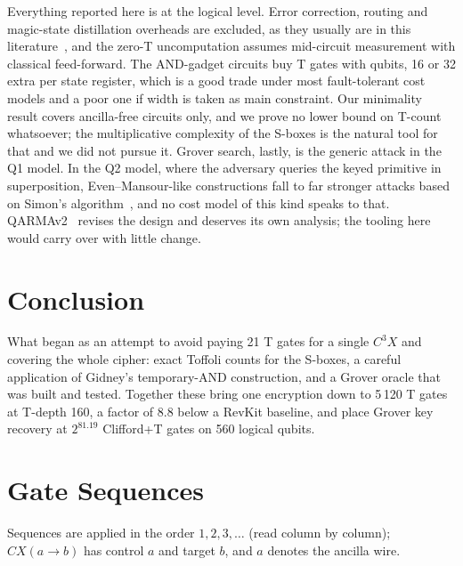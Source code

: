 \documentclass[runningheads,10pt]{llncs}
\begin{document}
Everything reported here is at the logical level. Error correction, routing and magic-state distillation overheads are excluded, as they usually are in this literature~\cite{grassl2016applying,jaques2020implementing}, and the zero-T uncomputation assumes mid-circuit measurement with classical feed-forward. The AND-gadget circuits buy T gates with qubits, 16 or 32 extra per state register, which is a good trade under most fault-tolerant cost models and a poor one if width is taken as main  constraint. Our minimality result covers ancilla-free circuits only, and we prove no lower bound on T-count whatsoever; the multiplicative complexity of the S-boxes is the natural tool for that and we did not pursue it. Grover search, lastly, is the generic attack in the Q1 model. In the Q2 model, where the adversary queries the keyed primitive in superposition, Even--Mansour-like constructions fall to far stronger attacks based on Simon's algorithm~\cite{kuwakado2012security,kaplan2016breaking}, and no cost model of this kind speaks to that. QARMAv2~\cite{avanzi2023qarmav2} revises the design and deserves its own analysis; the tooling here would carry over with little change.

\section{Conclusion}

What began as an attempt to avoid paying 21 T gates for a single $C^3X$ and covering the  whole cipher: exact Toffoli counts for the S-boxes, a careful application of Gidney's temporary-AND construction, and a Grover oracle that was built and tested. Together these bring one encryption down to 5\,120 T gates at T-depth 160, a factor of 8.8 below a RevKit baseline, and place Grover key recovery at $2^{81.19}$ Clifford+T gates on 560 logical qubits.

\appendix


\section{Gate Sequences}\label{app:gate-sequences}

Sequences are applied in the order $1,2,3,\ldots$ (read column by column); $CX(a\to b)$ has control $a$ and target $b$, and $a$ denotes the ancilla wire.
\end{document}
